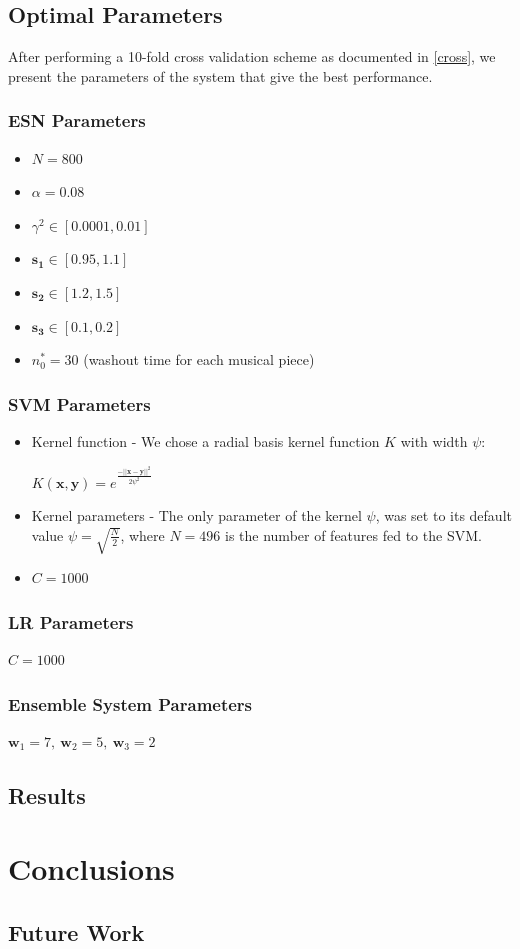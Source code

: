 \documentclass[a4paper,11pt,oneside]{article}
\begin{document}
\subsection{Optimal Parameters}
After performing a 10-fold cross validation scheme as documented in \ref{cross}, we present the parameters of the system
that give the best performance.
\subsubsection*{ESN Parameters}
\begin{itemize}
  \item $N = 800$
  \item $\alpha = 0.08$
  \item $\gamma^2 \in [0.0001,0.01]$
  \item $\mathbf{s_1}\in [0.95,1.1]$
  \item $\mathbf{s_2}\in [1.2,1.5]$
  \item $\mathbf{s_3}\in [0.1,0.2]$
  \item $n_0^* = 30$ (washout time for each musical piece)
\end{itemize}
\subsubsection*{SVM Parameters}
\begin{itemize}
  \item Kernel function - We chose a radial basis kernel function $K$ with width $\psi$:
  
  \begin{math}
    K(\mathbf{x},\mathbf{y}) = e^{\frac{-||\mathbf{x}-\mathbf{y}||^2}{2\psi^2}}
  \end{math}
    \item Kernel parameters - The only parameter of the kernel $\psi$, was set to its default value
    $\psi = \sqrt{\frac{N}{2}}$, where $N = 496$ is the number of features fed to the SVM.
    \item $C = 1000$
\end{itemize}
\subsubsection*{LR Parameters} $C = 1000$
\subsubsection*{Ensemble System Parameters}
$\mathbf{w}_1 = 7,\ \mathbf{w}_2 = 5,\ \mathbf{w}_3 = 2$
\subsection{Results}
\section{Conclusions}
\subsection{Future Work}
\nocite{*}
\newpage


\end{document}

